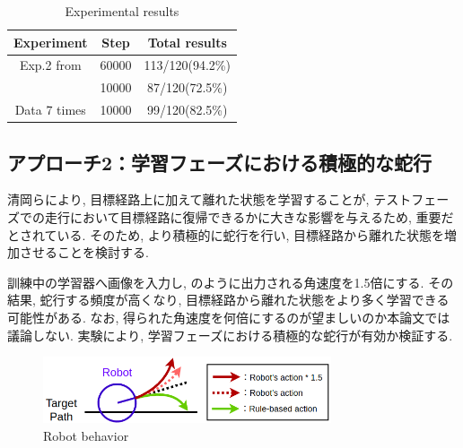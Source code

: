 \documentclass{jarticle}
\begin{document}
 \begin{table}[H]
  \caption{Experimental results}
  \label{tbl: table4}
  \centering
  \footnotesize
  \vspace{2mm}
  \begin{tabular}{|c|c|c|}
   \hline
   Experiment & Step & Total results \\\hline
   Exp.2 from \cite{mech} & 60000 & 113/120(94.2\%) \\ \cline{2-3}
  & 10000 & 87/120(72.5\%)\\\hline
  Data 7 times & 10000 & 99/120(82.5\%)\\
   \hline
  \end{tabular}
 \end{table}

\subsection{アプローチ2：学習フェーズにおける積極的な蛇行}
清岡ら\cite{kiyooka}により, 目標経路上に加えて離れた状態を学習することが, テストフェーズでの走行において目標経路に復帰できるかに大きな影響を与えるため, 重要だとされている. そのため, より積極的に蛇行を行い, 目標経路から離れた状態を増加させることを検討する.
\par
訓練中の学習器へ画像を入力し, のように出力される角速度を1.5倍にする. その結果, 蛇行する頻度が高くなり, 目標経路から離れた状態をより多く学習できる可能性がある. なお, 得られた角速度を何倍にするのが望ましいのか本論文では議論しない. 実験により, 学習フェーズにおける積極的な蛇行が有効か検証する.

\begin{figure}[h]
  \centering
   \includegraphics[width=85mm]{3action3.png}
   \vspace*{-4mm}
   \caption{Robot behavior}
   \label{fig: fig12}
 \end{figure}

\end{document}

